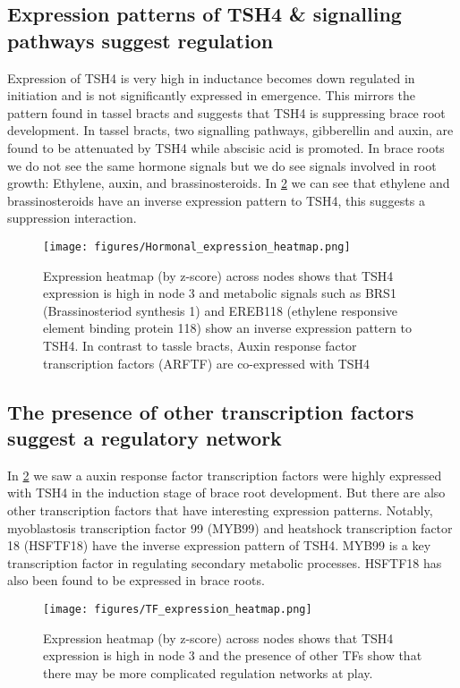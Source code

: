 \subsection{Expression patterns of TSH4 \& signalling pathways suggest regulation}
Expression of TSH4 is very high in inductance becomes down regulated in initiation and is not significantly expressed in emergence. This mirrors the pattern found in tassel bracts and suggests that TSH4 is suppressing brace root development. In tassel bracts, two signalling pathways, gibberellin and auxin, are found to be attenuated by TSH4 while abscisic acid is promoted.\cite{Xiao2022} In brace roots we do not see the same hormone signals but we do see signals involved in root growth: Ethylene, auxin, and brassinosteroids. In \ref{fig:meta-express} we can see that ethylene and brassinosteroids have an inverse expression pattern to TSH4, this suggests a suppression interaction.  
\begin{figure}[H]
    \centering
    \begin{mdframed}[backgroundcolor=green!20]
    \centering
    \texttt{[image: figures/Hormonal\_expression\_heatmap.png]}
    \caption{Expression heatmap (by z-score) across nodes shows that TSH4 expression is high in node 3 and metabolic signals such as BRS1 (Brassinosteriod synthesis 1) and EREB118 (ethylene responsive element binding protein 118) show an inverse expression pattern to TSH4. In contrast to tassle bracts, Auxin response factor transcription factors (ARFTF) are co-expressed with TSH4}
    \label{fig:meta-express}
    \end{mdframed}
\end{figure}
\subsection{The presence of other transcription factors suggest a regulatory network}
In \ref{fig:meta-express} we saw a auxin response factor transcription factors were highly expressed with TSH4 in the induction stage of brace root development. But there are also other transcription factors that have interesting expression patterns. Notably, myoblastosis transcription factor 99 (MYB99) and heatshock transcription factor 18 (HSFTF18) have the inverse expression pattern of TSH4. MYB99 is a key transcription factor in regulating secondary metabolic processes. \cite{Cao2020} HSFTF18 has also been found to be expressed in brace roots. \cite{Li2019} 
\begin{figure}[H]
    \centering
    \begin{mdframed}[backgroundcolor=green!20]
    \centering
    \texttt{[image: figures/TF\_expression\_heatmap.png]}
    \caption{Expression heatmap (by z-score) across nodes shows that TSH4 expression is high in node 3 and the presence of other TFs show that there may be more complicated regulation networks at play.}
    \label{fig:meta-express}
    \end{mdframed}
\end{figure}


